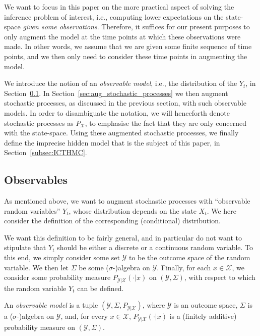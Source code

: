 \documentclass[twoside,11pt]{article}
\newcommand{\states}{\mathcal{X}}
\newcommand{\observs}{\mathcal{Y}}
\begin{document}
We want to focus in this paper on the more practical aspect of solving the inference problem of interest, i.e., computing lower expectations on the state-space \emph{given some observations}. Therefore, it suffices for our present purposes to only augment the model at the time points at which these observations were made. In other words, we assume that we are given some finite sequence of time points, and we then only need to consider these time points in augmenting the model.

We introduce the notion of an \emph{observable model}, i.e., the distribution of the $Y_t$, in Section~\ref{sec:observs}. In Section~\ref{sec:aug_stochastic_processes} we then augment stochastic processes, as discussed in the previous section, with such observable models. In order to disambiguate the notation, we will henceforth denote stochastic processes as $P_\states$, to emphasise the fact that they are only concerned with the state-space. Using these augmented stochastic processes, we finally define the imprecise hidden model that is the subject of this paper, in Section~\ref{subsec:ICTHMC}.

\subsection{Observables}\label{sec:observs}

As mentioned above, we want to augment stochastic processes with ``observable random variables'' $Y_t$, whose distribution depends on the state $X_t$. We here consider the definition of the corresponding (conditional) distribution.

We want this definition to be fairly general, and in particular do not want to stipulate that $Y_t$ should be either a discrete or a continuous random variable. To this end, we simply consider some set $\observs$ to be the outcome space of the random variable. We then let $\Sigma$ be some ($\sigma$-)algebra on $\observs$. Finally, for each $x\in\states$, we consider some probability measure $P_{\observs\vert\states}(\cdot\vert x)$ on $(\observs,\Sigma)$, with respect to which the random variable $Y_t$ can be defined.

\begin{definition}
An \emph{observable model} is a tuple $(\observs,\Sigma,P_{\observs\vert \states})$, where $\observs$ is an outcome space, $\Sigma$ is a ($\sigma$-)algebra on $\observs$, and, for every $x\in\states$, $P_{\observs\vert\states}(\cdot\vert x)$ is a (finitely additive) probability measure on $(\observs,\Sigma)$.
\end{definition}
\end{document}
